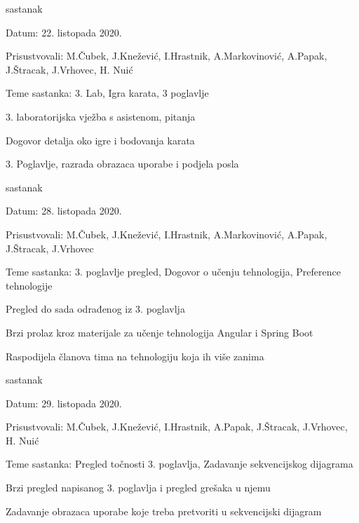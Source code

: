 \begin{packed_enum}
			\item  sastanak
			\item[] \begin{packed_item}
				\item Datum: 22. listopada 2020.
				\item Prisustvovali: M.Čubek, J.Knežević, I.Hrastnik, A.Markovinović, A.Papak, J.Štracak, J.Vrhovec, H. Nuić
				\item Teme sastanka: 3. Lab, Igra karata, 3 poglavlje
				\begin{packed_item}
					\item 3. laboratorijska vježba s asistenom, pitanja
					\item Dogovor detalja oko igre i bodovanja karata
					\item 3. Poglavlje, razrada obrazaca uporabe i podjela posla
				\end{packed_item}
			\end{packed_item}
		
			\item  sastanak
			\item[] \begin{packed_item}
				\item Datum: 28. listopada 2020.
				\item Prisustvovali: M.Čubek, J.Knežević, I.Hrastnik, A.Markovinović, A.Papak, J.Štracak, J.Vrhovec
				\item Teme sastanka: 3. poglavlje pregled, Dogovor o učenju tehnologija, Preference tehnologije
				\begin{packed_item}
					\item Pregled do sada odrađenog iz 3. poglavlja
					\item Brzi prolaz kroz materijale za učenje tehnologija Angular i Spring Boot
					\item Raspodijela članova tima na tehnologiju koja ih više zanima
				\end{packed_item}
			\end{packed_item}
		
			\item  sastanak
			\item[] \begin{packed_item}
				\item Datum: 29. listopada 2020.
				\item Prisustvovali: M.Čubek, J.Knežević, I.Hrastnik, A.Papak, J.Štracak, J.Vrhovec, H. Nuić
				\item Teme sastanka: Pregled točnosti 3. poglavlja, Zadavanje sekvencijskog dijagrama
				\begin{packed_item}
					\item Brzi pregled napisanog 3. poglavlja i pregled grešaka u njemu
					\item Zadavanje obrazaca uporabe koje treba pretvoriti u sekvencijski dijagram
				\end{packed_item}
			\end{packed_item}
		

\end{packed_enum}
